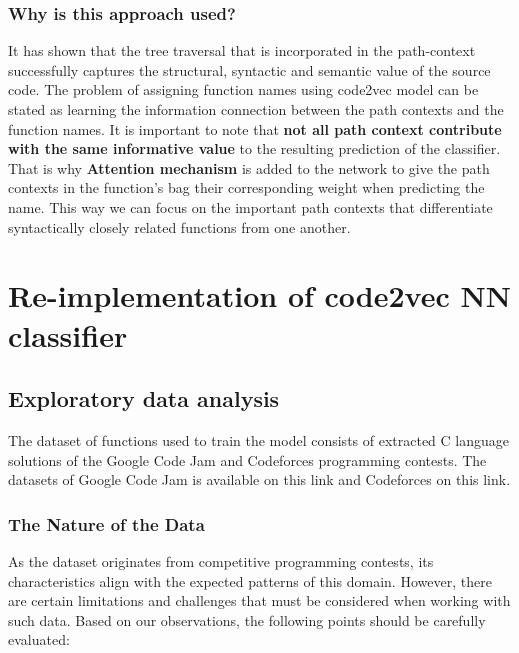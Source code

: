 \documentclass[10pt,english,a4paper]{report}
\begin{document}
\subsection{Why is this approach used?}
It has shown that the tree traversal that is incorporated in the path-context successfully captures the structural, syntactic and semantic value of the source code\cite{alon}. The problem of assigning function names using code2vec model
can be stated as learning the information connection between the path contexts and the function names. It is important to note that \textbf{not all path context contribute with the same informative value} to the resulting prediction of the classifier. That is why \textbf{Attention mechanism} \cite{attention} is added to the network to give the path contexts in the function's bag their corresponding weight when predicting the name. This way we can focus on the important path contexts that differentiate syntactically closely related functions from one another.


\chapter{Re-implementation of code2vec NN classifier}

\section{Exploratory data analysis}
\label{item:EDA}
The dataset of functions used to train the model consists of extracted C language solutions of the Google Code Jam and Codeforces programming contests. The datasets of Google Code Jam is available on this link and Codeforces on this link.

\subsection{The Nature of the Data}
As the dataset originates from competitive programming contests, its characteristics align with the expected patterns of this domain. However, there are certain limitations and challenges that must be considered when working with such data. Based on our observations, the following points should be carefully evaluated:
\end{document}
